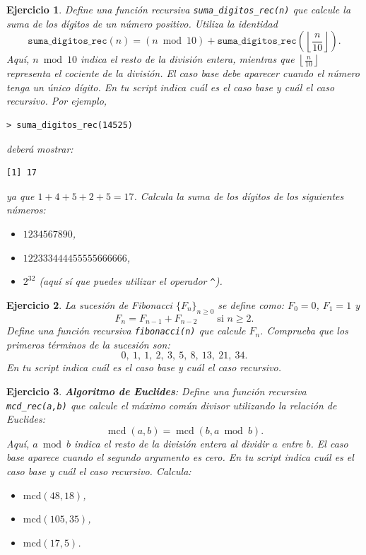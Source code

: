 \documentclass[11pt,a4paper]{article}
\theoremstyle{exercise}
\newtheorem{exercise}{Ejercicio}
\begin{document}
\begin{exercise} Define una función recursiva \texttt{suma\_digitos\_rec(n)} que calcule la suma de los dígitos de un número positivo. Utiliza la identidad
\[ 
\texttt{suma\_digitos\_rec}(n) = (n \bmod 10) + \texttt{suma\_digitos\_rec}\left(\left\lfloor\frac{n}{10}\right\rfloor\right). 
\]
Aquí, $n \bmod 10$ indica el resto de la división entera, mientras que $\left\lfloor\frac{n}{10}\right\rfloor$ representa el cociente de la división. El caso base debe aparecer cuando el número tenga un único dígito. En tu script indica cuál es el caso base y cuál el caso recursivo. Por ejemplo,
\begin{lstlisting}[style=rconsole]
> suma_digitos_rec(14525)
\end{lstlisting}	
deberá mostrar:
\begin{lstlisting}[style=routput]
[1] 17
\end{lstlisting}
ya que $1+4+5+2+5=17$. Calcula la suma de los dígitos de los siguientes números:
\begin{itemize}
	\item $1234567890$,
	\item $122333444455555666666$,
	\item $2^{32}$ (aquí sí que puedes utilizar el operador  \texttt{\^}).
\end{itemize}
\end{exercise}




\begin{exercise} La sucesión de Fibonacci $\{F_n\}_{n \geq 0}$ se define como: $F_0=0$, $F_1=1$ y 
\[ F_n = F_{n-1} + F_{n-2} \qquad \text{si } n \geq 2. \]
Define una función recursiva \texttt{fibonacci(n)} que calcule $F_n$. Comprueba que los primeros términos de la sucesión son:
\[
0,\ 1,\ 1,\ 2,\ 3,\ 5,\ 8,\ 13,\ 21,\ 34.
\]
En tu script indica cuál es el caso base y cuál el caso recursivo. 
\end{exercise}




\begin{exercise} \textbf{Algoritmo de Euclides}: Define una función recursiva \texttt{mcd\_rec(a,b)} que calcule el máximo común divisor utilizando la relación de Euclides: 
\[ \operatorname{mcd}(a,b) = \operatorname{mcd}(b, a \bmod b). \]
Aquí, $a \bmod b$ indica el resto de la división entera al dividir $a$ entre $b$. El caso base aparece cuando el segundo argumento es cero.  En tu script indica cuál es el caso base y cuál el caso recursivo. Calcula:
\begin{itemize}
	\item $\text{mcd}(48,18)$,
	\item $\text{mcd}(105,35)$,
	\item $\text{mcd}(17,5)$.
\end{itemize} 
\end{exercise}
\end{document}
